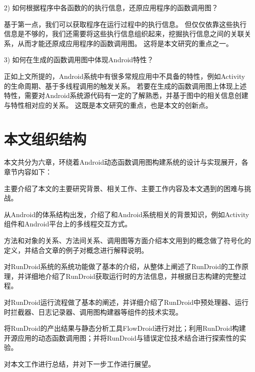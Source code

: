 2)	如何根据程序中各函数的的执行信息，还原应用程序的函数调用图？

基于第一点，我们可以获取程序在运行过程中的执行信息。
但仅仅依靠这些执行信息是不够的，我们还需要将这些执行信息组织起来，挖掘执行信息之间的关联关系，从而才能还原成应用程序的函数调用图。
这将是本文研究的重点之一。

3)	如何在生成的函数调用图中体现Android特性？

正如上文所提的，Android系统中有很多常规应用中不具备的特性，例如Activity的生命周期、基于多线程调用的触发关系。
若要在生成的函数调用图上体现上述特性，需要对Android系统源代码有一定的了解熟悉，并基于图中的相关信息创建与特性相对应的关系。
这既是本文研究的重点，也是本文的创新点。


\section{本文组织结构}


本文共分为六章，环绕着Android动态函数调用图构建系统的设计与实现展开，各章节内容如下：

主要介绍了本文的主要研究背景、相关工作、主要工作内容及本文遇到的困难与挑战。

从Android的体系结构出发，介绍了和Android系统相关的背景知识，例如Activity组件和Android平台上的多线程交互方式。

方法和对象的关系、方法间关系、调用图等方面介绍本文用到的概念做了符号化的定义，并结合文章的例子对概念进行解释说明。

对RunDroid系统的系统功能做了基本的介绍，从整体上阐述了RunDroid的工作原理，并详细地介绍了RunDroid获取运行时的方法信息，并根据日志构建\ecg 的完整过程。


对RunDroid运行流程做了基本的阐述，并详细介绍了RunDroid中预处理器、运行时拦截器、日志记录器、调用图构建器等组件的技术实现。

 将RunDroid的产出结果与静态分析工具FlowDroid进行对比；利用RunDroid构建开源应用的动态函数调用图；并将RunDroid与错误定位技术结合进行探索性的实验。

对本文工作进行总结，并对下一步工作进行展望。


